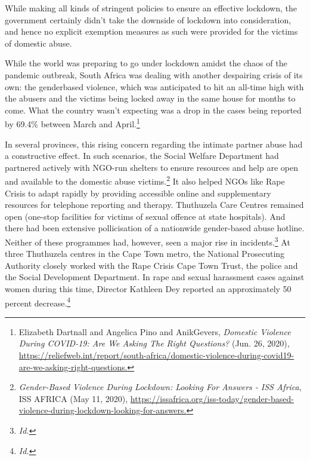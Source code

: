 \begin{multicols}{2}
\noi
While making all kinds of stringent policies to ensure an effective lockdown, the government
certainly didn’t take the downside of lockdown into consideration, and hence no explicit
exemption measures as such were provided for the victims of domestic abuse. 

\vspace{-.1cm}


\vspace{-.1cm}

\noi
While the world was preparing to go under lockdown amidst the chaos of the pandemic
outbreak, South Africa was dealing with another despairing crisis of its own: the genderbased violence, which was anticipated to hit an all-time high with the abusers and the victims being locked away in the same house for months to come. What the country wasn’t expecting
was a drop in the cases being reported by 69.4\% between March and April.\footnote{Elizabeth Dartnall and Angelica Pino and AnikGevers, \textit{Domestic Violence During COVID-19: Are We Asking
The Right Questions?} (Jun. 26, 2020), \url{https://reliefweb.int/report/south-africa/domestic-violence-during-covid19-are-we-asking-right-questions.}}

\noi
In several provinces, this rising concern regarding the intimate partner abuse had a
constructive effect. In such scenarios, the Social Welfare Department had partnered actively
with NGO-run shelters to ensure resources and help are open and available to the domestic
abuse victims.\footnote{\textit{Gender-Based Violence During Lockdown: Looking For Answers - ISS Africa}, ISS AFRICA (May 11, 2020),
\url{https://issafrica.org/iss-today/gender-based-violence-during-lockdown-looking-for-answers.}} It also helped NGOs like Rape Crisis to adapt rapidly by providing accessible
online and supplementary resources for telephone reporting and therapy. Thuthuzela Care
Centres remained open (one-stop facilities for victims of sexual offence at state hospitals).
And there had been extensive pollicisation of a nationwide gender-based abuse hotline.
Neither of these programmes had, however, seen a major rise in incidents.\footnote{\textit{Id.}} At three
Thuthuzela centres in the Cape Town metro, the National Prosecuting Authority closely
worked with the Rape Crisis Cape Town Trust, the police and the Social Development
Department. In rape and sexual harassment cases against women during this time, Director
Kathleen Dey reported an approximately 50 percent decrease.\footnote{\textit{Id.}}


\end{multicols}
